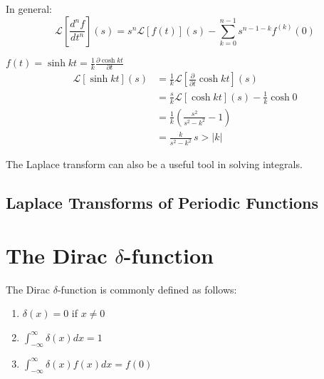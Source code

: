 \documentclass{../../physics_notes}
\newcommand{\zintfty}{\int_0^\infty}
\renewcommand{\L}[2]{\mathcal{L}\left[#1\right](#2)}
\DeclareMathOperator{\sgn}{sgn}
\begin{document}
In general:
\begin{equation*}
\L{\frac{d^n f}{dt^n}}{s} = s^n\L{f(t)}{s} - \sum_{k=0}^{n-1} s^{n-1-k}f^{(k)}(0)
\end{equation*}

\begin{example}{$f(t) = \sinh{kt} = \frac{1}{k}\frac{\partial \cosh{kt}}{\partial t}$}
\begin{align*}
\L{\sinh{kt}}{s} &= \frac{1}{k}\L{\frac{\partial}{\partial t}\cosh{kt}}{s} \\
&= \frac{s}{k}\L{\cosh{kt}}{s} - \frac{1}{k}\cosh{0} \\
&= \frac{1}{k}\left(\frac{s^2}{s^2 - k^2} - 1\right) \\
&= \frac{k}{s^2 - k^2} \, s>|k|
\end{align*}
\end{example}

The Laplace transform can also be a useful tool in solving integrals.



\subsection{Laplace Transforms of Periodic Functions}


\section{The Dirac $\delta$-function}\label{sec:dirac_delta}

The Dirac $\delta$-function is commonly defined as follows:

\begin{enumerate}
	\item $\delta(x) = 0$ if $x$
	\item $\int_{-\infty}^\infty \delta(x) dx = 1$
	\item $\int_{-\infty}^\infty \delta(x) f(x) dx = f(0)$
\end{enumerate}
\end{document}
